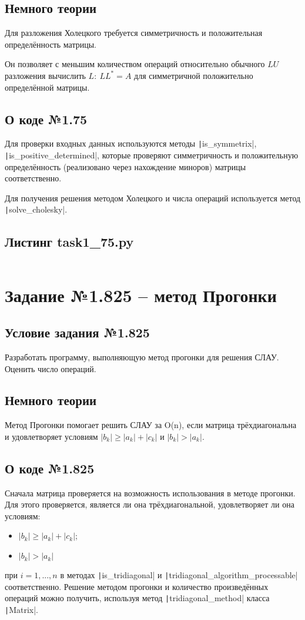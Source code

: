 \subsection{Немного теории}
Для разложения Холецкого требуется симметричность и положительная определённость матрицы.

Он позволяет с меньшим количеством операций относительно обычного $LU$ разложения вычислить $L:\ LL^*=A$ для симметричной положительно определённой матрицы.
\subsection{О коде №1.75}
Для проверки входных данных используются методы \texttt|is_symmetrix|, \texttt|is_positive_determined|, которые проверяют симметричность и положительную определённость (реализовано через нахождение миноров) матрицы соответственно.

Для получения решения методом Холецкого и числа операций используется метод \texttt|solve_cholesky|.

\subsection{Листинг task1\_75.py}
\inputminted{python}{code/task1_75.py}

\section{Задание №1.825 -- метод Прогонки}
\subsection{Условие задания №1.825}
Разработать программу, выполняющую метод прогонки для решения
СЛАУ. Оценить число операций.
\subsection{Немного теории}
Метод Прогонки помогает решить СЛАУ за O(n), если матрица трёхдиагональна и удовлетворяет условиям $|b_k| \geq |a_k| + |c_k|$ и $|b_k| > |a_k|$.
\subsection{О коде №1.825}
Сначала матрица проверяется на возможность использования в методе прогонки. Для этого проверяется, является ли она трёхдиагональной, удовлетворяет ли она условиям:
\begin{itemize}
    \item $|b_k| \geq |a_k| + |c_k|$;
    \item $|b_k| > |a_k|$
\end{itemize}
при $i=1,...,n$ в методах \texttt|is_tridiagonal| и \texttt|tridiagonal_algorithm_processable| соответственно.
Решение методом прогонки и количество произведённых операций можно получить, используя метод \texttt|tridiagonal_method| класса \texttt|Matrix|.

